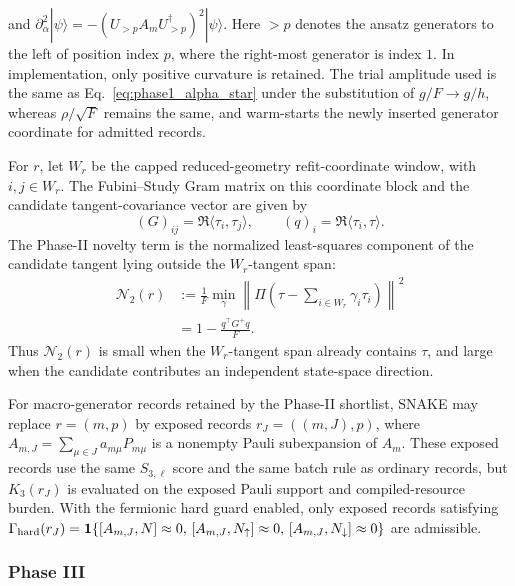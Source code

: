 \documentclass[
  reprint,
  amsmath,
  amssymb,
  aps,
  pra,
  nofootinbib,
  superscriptaddress,
  floatfix
]{revtex4-2}
\newcommand{\ket}[1]{|#1\rangle}
\begin{document}
and $\partial^2_{\alpha}\ket{\psi} =-(U_{>p}A_mU_{>p}^{\dagger})^2\ket{\psi}.$ Here \(>p\) denotes the ansatz generators to the left of position index \(p\), where the right-most generator is index \(1\). In implementation, only positive curvature is retained. The trial amplitude used is the same as Eq.~\ref{eq:phase1_alpha_star} under the substitution of $g/F \to g / h$, whereas $\rho/\sqrt{F}$ remains the same, and warm-starts the newly inserted generator coordinate for admitted records.

For \(r\), let \(W_r\) be the capped reduced-geometry refit-coordinate window, with \(i,j\in W_r\). The Fubini--Study Gram matrix on this coordinate block and the candidate tangent-covariance vector are given by
\begin{equation*}
(G)_{ij}=\Re\langle\tau_i,\tau_j\rangle,
\qquad
(q)_i=\Re\langle\tau_i,\tau\rangle.
\end{equation*}
The Phase-II novelty term is the normalized least-squares component of the candidate tangent lying outside the \(W_r\)-tangent span:
\begin{equation}
\begin{aligned}
\mathcal N_2(r)
&:=
\frac{1}{F}
\min_{\gamma}
\left\|
\Pi\left(\tau-\sum_{i\in W_r}\gamma_i\tau_i\right)
\right\|^2 \\
&=
1-
\frac{q^{\top}G^+q}{F}.
\end{aligned}
\label{eq:phase2_novelty}
\end{equation}
Thus $\mathcal N_2(r)$ is small when the \(W_r\)-tangent span already contains $\tau$, and large when the candidate contributes an independent state-space direction.

For macro-generator records retained by the Phase-II shortlist, SNAKE may replace \(r=(m,p)\) by exposed records \(r_J=((m,J),p)\), where \(A_{m,J}=\sum_{\mu\in J}a_{m\mu}P_{m\mu}\) is a nonempty Pauli subexpansion of \(A_m\). These exposed records use the same \(S_{3,\ell}\) score and the same batch rule as ordinary records, but \(K_3(r_J)\) is evaluated on the exposed Pauli support and compiled-resource burden. With the fermionic hard guard enabled, only exposed records satisfying \(\Gamma_{\rm hard}(r_J)=\mathbf 1\{[A_{m,J},N]\approx0,\,[A_{m,J},N_\uparrow]\approx0,\,[A_{m,J},N_\downarrow]\approx0\}\) are admissible.

\subsubsection{Phase III}
\end{document}

